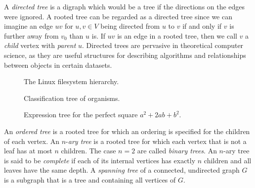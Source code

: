 A \emph{directed tree} is a
digraph which would be a tree if the directions on the
edges were ignored. A rooted tree can be regarded
as a directed tree since we can imagine an edge
$uv$ for $u,v \in V$ being directed from $u$ to $v$ if and only if $v$ is
further away from $v_0$ than $u$ is. If $uv$ is an edge in a
rooted tree, then we call $v$ a
\emph{child} vertex with
\emph{parent} $u$. Directed
trees are pervasive in theoretical computer science, as they are
useful structures for describing algorithms and relationships between
objects in certain datasets.

\begin{figure}[!htbp]
\centering
{}

\caption{The Linux filesystem hierarchy.}
\label{fig:trees_forests:filesystem_hierarchy}
\end{figure}

\begin{figure}[!htbp]
\centering
{}

\caption{Classification tree of organisms.}
\label{fig:trees_forests:classification_tree_organisms}
\end{figure}

\begin{figure}[!htbp]
\centering
{}

\caption{Expression tree for the perfect square $a^2 + 2ab + b^2$.}
\label{fig:trees_forests:expression_tree_perfect_square}
\end{figure}

An \emph{ordered tree} is a
rooted tree for which an ordering is specified for
the children of each vertex. An
$n$-\emph{ary tree} is a rooted tree for which
each vertex that is not a leaf has at most $n$
children. The case $n = 2$ are called
\emph{binary trees}. An $n$-ary
tree is said to be \emph{complete} if each of its
internal vertices has exactly $n$
children and all leaves have
the same depth. A
\emph{spanning tree} of a connected, undirected
graph $G$ is a subgraph that is a tree and containing all vertices of
$G$.

